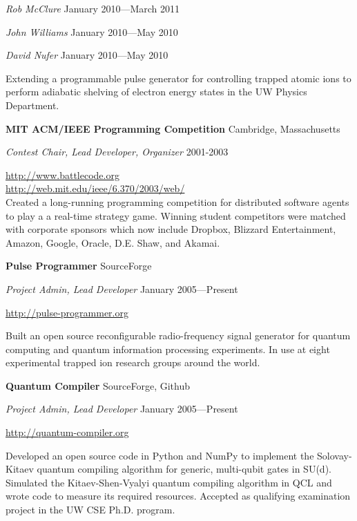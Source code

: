 \documentclass[letter]{article}
\begin{document}
\vspace{0.5\baselineskip}
\par
\emph{Rob McClure} \hfill January 2010---March 2011
\par
\emph{John Williams} \hfill January 2010---May 2010
\par
\emph{David Nufer} \hfill January 2010---May 2010
\par
Extending a programmable pulse generator for controlling trapped atomic
ions to perform adiabatic shelving of electron energy states in the UW
Physics Department.

\vspace{\baselineskip}

{\bf MIT ACM/IEEE Programming Competition} \hfill Cambridge, Massachusetts

{\em Contest Chair, Lead Developer, Organizer} \hfill 2001-2003
\vspace{0.5\baselineskip}
\par

\url{http://www.battlecode.org}\\
\url{http://web.mit.edu/ieee/6.370/2003/web/}\\
Created a long-running
programming competition for distributed software agents to play a
a real-time strategy game. Winning student competitors were matched with
corporate sponsors which now include
Dropbox, Blizzard Entertainment, Amazon, Google, Oracle, D.E. Shaw, and Akamai.

\vspace{\baselineskip}
\par
{\bf {Pulse Programmer}} \hfill SourceForge
\par
{\em Project Admin, Lead Developer} \hfill January 2005---Present
\par
\url{http://pulse-programmer.org}
\par
Built an open source reconfigurable radio-frequency signal generator
for quantum computing and quantum information processing experiments.
In use at eight experimental trapped ion research groups around the world.

\vspace{\baselineskip}
\par
{\bf {Quantum Compiler}} \hfill SourceForge, Github
\par
{\em Project Admin, Lead Developer} \hfill January 2005---Present
\par
\url{http://quantum-compiler.org}
\par
Developed an open source code in Python and NumPy to implement the
Solovay-Kitaev quantum compiling algorithm for generic, multi-qubit gates
in SU(d). Simulated the Kitaev-Shen-Vyalyi quantum compiling algorithm in
QCL and wrote code to measure its required resources. Accepted as
qualifying examination project in the UW CSE Ph.D. program.
\end{document}
